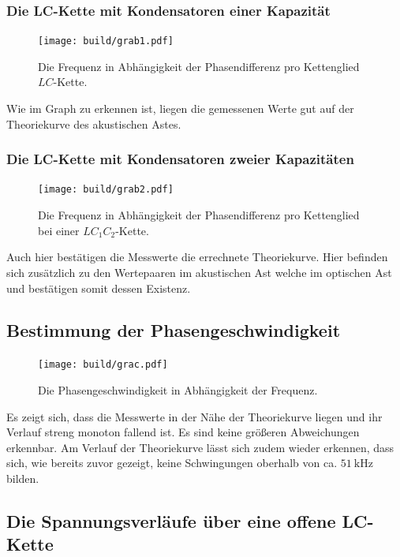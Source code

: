 \subsubsection{Die LC-Kette mit Kondensatoren einer Kapazität}
\begin{figure}[H]
	\centering
	\caption{Die Frequenz in Abhängigkeit der Phasendifferenz pro Kettenglied $LC$-Kette.}
	\texttt{[image: build/grab1.pdf]}
	\label{fig:grab1}
\end{figure}

Wie im Graph zu erkennen ist, liegen die gemessenen Werte gut auf der Theoriekurve des akustischen Astes.

\subsubsection{Die LC-Kette mit Kondensatoren zweier Kapazitäten}
\begin{figure}[H]
	\centering
	\caption{Die Frequenz in Abhängigkeit der Phasendifferenz pro Kettenglied bei einer $LC_1C_2$-Kette.}
	\texttt{[image: build/grab2.pdf]}
	\label{fig:grab2}
\end{figure}

Auch hier bestätigen die Messwerte die errechnete Theoriekurve. Hier befinden sich zusätzlich zu den Wertepaaren im akustischen Ast welche im optischen Ast und bestätigen somit dessen Existenz. 


\subsection{Bestimmung der Phasengeschwindigkeit}

\begin{figure}[H]
	\centering
	\caption{Die Phasengeschwindigkeit in Abhängigkeit der Frequenz.}
	\texttt{[image: build/grac.pdf]}
	\label{fig:grac}
\end{figure}

Es zeigt sich, dass die Messwerte in der Nähe der Theoriekurve liegen und ihr Verlauf
 streng monoton fallend ist. Es sind keine größeren Abweichungen erkennbar. Am
  Verlauf der Theoriekurve lässt sich zudem wieder erkennen, dass sich, wie bereits zuvor
 gezeigt, keine Schwingungen oberhalb von ca. $\SI{51}{\kilo\hertz}$ bilden.

\subsection{Die Spannungsverläufe über eine offene LC-Kette}
